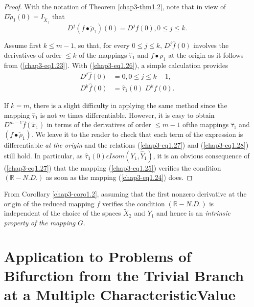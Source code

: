 \begin{proof}
With the notation of Theorem \ref{chap3-thm1.2}, note that in view of
$D\widetilde{\rho}_{1} (0) = I_{\widetilde{X}_{1}}$ that
\begin{equation*}
D^{j}(f \bullet \widetilde{\rho}_{1})(0) = D^{j}f(0), 0 \leq j \leq k.\tag{1.26}\label{chap3-eq1.26}
\end{equation*}

Assume first $k \leq m-1$, so that, for every $0 \leq j \leq k$,
$D^{j}\hat{f}(0)$ involves the derivatives of order $\leq k$ of the
mappings $\hat{\tau}_{1}$ and $f \bullet \rho_{1}$ at the origin as it
follows from (\ref{chap3-eq1.23}). With (\ref{chap3-eq1.26}), a simple
calculation provides
\begin{align*}
D^{j}\hat{f}(0) & = 0, 0 \leq j \leq
k-1,\tag{1.27}\label{chap3-eq1.27}\\
D^{k}\hat{f}(0) & = \hat{\tau}_{1}(0) \; D^{k}f(0).\tag{1.28}\label{chap3-eq1.28}
\end{align*}

If $k = m$, there is a slight difficulty in applying the same method
since the mapping $\hat{\tau}_{1}$ is not $m$ times
differentiable. However, it is easy to obtain $D^{m-1}
\hat{f}(\widetilde{x}_{1})$ in terms of the derivatives of order $\leq
m - 1$ of\pageoriginale the mappings $\hat{\tau}_{1}$ and $(f \bullet
\widetilde{\rho}_{1})$. We leave it to the reader to check that each
term of the expression is differentiable {\em at the origin} and the
relations (\ref{chap3-eq1.27}) and (\ref{chap3-eq1.28}) still hold. In
particular, as $\hat{\tau}_{1}(0) \epsilon Isom (Y_{1}, \hat{Y}_{1})$,
it is an obvious consequence of (\ref{chap3-eq1.27}) that the mapping
(\ref{chap3-eq1.25}) verifies the condition $(\mathbb{R}-N.D.)$ as
soon as the mapping (\ref{chap3-eq1.24}) does.
\end{proof}

\begin{remark}\label{chap3-rem1.2}
From Corollary \ref{chap3-coro1.2}, assuming that the first nonzero
derivative at the origin of the reduced mapping $f$ verifies the
condition $(\mathbb{R}-N.D.)$ is independent of the choice of the
spaces $\widetilde{X}_{2}$ and $Y_{1}$ and hence is an {\em intrinsic
  property of the mapping $G$}.
\end{remark}

\section[Application to Problems of Bifurction.....]{Application to Problems of Bifurction from the Trivial Branch
  at a Multiple Characteristic\hfil\break Value}\label{chap3-sec2}

